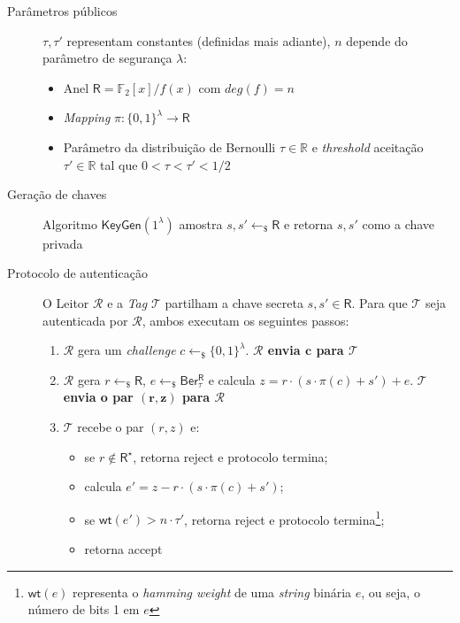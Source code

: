 \begin{description}
  \item[Parâmetros públicos] $\tau, \tau'$ representam constantes (definidas mais adiante), $n$ depende do parâmetro de segurança $\lambda$:
    \begin{itemize}
      \item Anel $\mathsf{R} = \mathbb{F}_2[x]/f(x)$ com $deg(f) = n$
      \item \textit{Mapping} $\pi : \{0,1\}^\lambda \rightarrow \mathsf{R}$
      \item Parâmetro da distribuição de Bernoulli $\tau \in \mathbb{R}$ e \textit{threshold} aceitação $\tau' \in \mathbb{R}$ tal que $0 < \tau < \tau' < 1/2$
    \end{itemize}
  \item[Geração de chaves] Algoritmo $\mathsf{KeyGen}(1^\lambda)$ amostra $s, s' \longleftarrow_{\$} \mathsf{R}$ e retorna $s, s'$ como a chave privada
  \item[Protocolo de autenticação] O Leitor $\mathcal{R}$ e a \textit{Tag} $\mathcal{T}$ partilham a chave secreta $s, s' \in \mathsf{R}$. Para que $\mathcal{T}$ seja autenticada por $\mathcal{R}$, ambos executam os seguintes passos:
    \begin{enumerate}
      \item $\mathcal{R}$ gera um \textit{challenge} $c \longleftarrow_{\$} \{0,1\}^\lambda$. \textbf{$\mathbf{\mathcal{R}}$ envia $\mathbf{c}$ para $\mathbf{\mathcal{T}}$}
      \item $\mathcal{R}$ gera $r \longleftarrow_{\$} \mathsf{R}$, $e \longleftarrow_{\$} \mathsf{Ber^{R}_\tau}$ e calcula $z = r \cdot (s \cdot \pi(c) + s') + e$. \textbf{$\mathbf{\mathcal{T}}$ envia o par $\mathbf{(r,z)}$ para $\mathbf{\mathcal{R}}$}
      \item $\mathcal{T}$ recebe o par $(r,z)$ e:
        \begin{itemize}
          \item se $r \notin \mathsf{R}^\star$, retorna \textsf{reject} e protocolo termina;
          \item calcula $e' = z - r \cdot (s \cdot \pi(c) + s')$;
          \item se $\mathsf{wt}(e') > n \cdot \tau'$, retorna \textsf{reject} e protocolo termina\footnote{$\mathsf{wt}(e)$ representa o \textit{hamming weight} de uma \textit{string} binária $e$, ou seja, o número de bits 1 em $e$};
          \item retorna \textsf{accept}
        \end{itemize}
    \end{enumerate}
\end{description}
